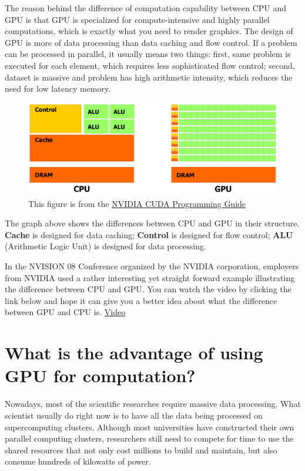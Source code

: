 \documentclass[letterpaper,10pt,openany,oneside]{sphinxmanual}
\begin{document}
The reason behind the difference of computation capability between CPU and GPU is that GPU is specialized for compute-intensive and highly parallel computations, which is exactly what you need to render graphics. The design of GPU is more of data processing than data caching and flow control. If a problem can be processed in parallel, it usually means two things: first, same problem is executed for each element, which requires less sophisticated flow control; second, dataset is massive and problem has high arithmetic intensity, which reduces the need for low latency memory.
\begin{figure}[htbp]
\centering
\capstart

\includegraphics{CPUGPU.png}
\caption{This figure is from the \href{http://developer.download.nvidia.com/compute/DevZone/docs/html/C/doc/CUDA\_C\_Programming\_Guide.pdf}{NVIDIA CUDA Programming Guide}}\end{figure}

The graph above shows the differences between CPU and GPU in their structure. \textbf{Cache} is designed for data caching; \textbf{Control} is designed for flow control; \textbf{ALU} (Arithmetic Logic Unit) is designed for data processing.

In the NVISION 08 Conference organized by the NVIDIA corporation, employers from NVIDIA used a rather interesting yet straight forward example illustrating the difference between CPU and GPU. You can watch the video by clicking the link below and hope it can give you a better idea about what the difference between GPU and CPU is.
\href{http://www.NVIDIA.com/object/nvision08\_gpu\_v\_cpu.html}{Video}


\section{What is the advantage of using GPU for computation?}
\label{Introduction/Introduction:nvidia-cuda-programming-guide}\label{Introduction/Introduction:what-is-the-advantage-of-using-gpu-for-computation}
Nowadays, most of the scientific researches require massive data processing. What scientist usually do right now is to have all the data being processed on supercomputing clusters. Although most universities have constructed their own parallel computing clusters, researchers still need to compete for time to use the shared resources that not only cost millions to build and maintain, but also consume hundreds of kilowatts of power.
\end{document}

